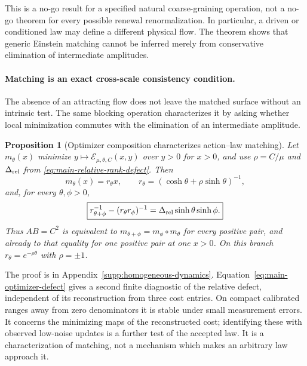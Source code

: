 \documentclass[11pt]{article}
\newtheorem{proposition}[proposition]{Proposition}
\theoremstyle{definition}
\theoremstyle{remark}
\begin{document}
This is a no-go result for a specified natural coarse-graining operation, not a
no-go theorem for every possible renewal renormalization.  In particular, a
driven or conditioned law may define a different physical flow.  The theorem
shows that generic Einstein matching cannot be inferred merely from conservative
elimination of intermediate amplitudes.

\paragraph{Matching is an exact cross-scale consistency condition.}
The absence of an attracting flow does not leave the matched surface without
an intrinsic test.  The same blocking operation characterizes it by asking
whether local minimization commutes with the elimination of an intermediate
amplitude.

\begin{proposition}[Optimizer composition characterizes action--law matching]
\label{prop:main-optimizer-composition}
Let $m_\theta(x)$ minimize
$y\mapsto\mathcal E_{\mu,\theta,C}(x,y)$ over $y>0$ for $x>0$, and use
$\rho=C/\mu$ and $\Delta_{\rm rel}$ from
\eqref{eq:main-relative-rank-defect}.  Then
\begin{equation}
 m_\theta(x)=r_\theta x,\qquad
 r_\theta=(\cosh\theta+\rho\sinh\theta)^{-1},
 \label{eq:main-optimizer-map}
\end{equation}
and, for every $\theta,\phi>0$,
\begin{equation}
 \boxed{r_{\theta+\phi}^{-1}-(r_\theta r_\phi)^{-1}
       =\Delta_{\rm rel}\sinh\theta\sinh\phi.}
 \label{eq:main-optimizer-defect}
\end{equation}
Thus $AB=C^2$ is equivalent to
$m_{\theta+\phi}=m_\phi\circ m_\theta$ for every positive pair, and already
to that equality for one positive pair at one $x>0$.  On this branch
$r_\theta=e^{-\rho\theta}$ with $\rho=\pm1$.
\end{proposition}

The proof is in Appendix~\ref{supp:homogeneous-dynamics}.
Equation~\eqref{eq:main-optimizer-defect} gives a second finite diagnostic of
the relative defect, independent of its reconstruction from three cost
entries.  On compact calibrated ranges away from zero denominators it is
stable under small measurement errors.  It concerns the minimizing maps of
the reconstructed cost; identifying these with observed low-noise updates is
a further test of the accepted law.  It is a characterization of matching,
not a mechanism which makes an arbitrary law approach it.
\end{document}
